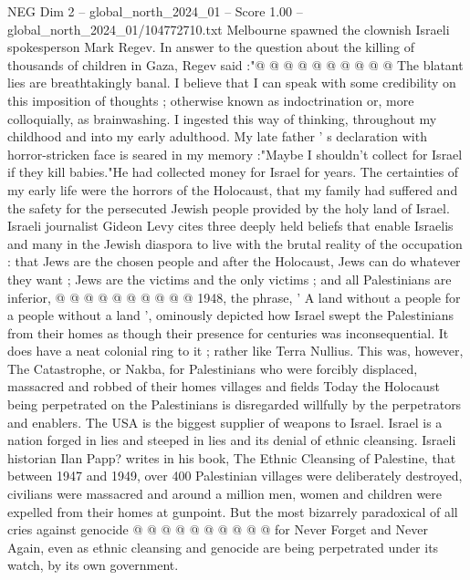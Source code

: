\begin{textsample}{NEG Dim 2 – global\_north\_2024\_01 – Score 1.00 – global\_north\_2024\_01/104772710.txt}
Melbourne spawned the clownish Israeli spokesperson Mark Regev.
In answer to the question about the killing of thousands of children in Gaza, Regev said :"@ @ @ @ @ @ @ @ @ @ The blatant lies are breathtakingly banal.
I believe that I can speak with some credibility on this imposition of thoughts ; otherwise known as indoctrination or, more colloquially, as brainwashing.
I ingested this way of thinking, throughout my childhood and into my early adulthood.
My late father ' s declaration with horror-stricken face is seared in my memory :"Maybe I shouldn't collect for Israel if they kill babies."He had collected money for Israel for years.
The certainties of my early life were the horrors of the Holocaust, that my family had suffered and the safety for the persecuted Jewish people provided by the holy land of Israel.
Israeli journalist Gideon Levy cites three deeply held beliefs that enable Israelis and many in the Jewish diaspora to live with the brutal reality of the occupation : that Jews are the chosen people and after the Holocaust, Jews can do whatever they want ; Jews are the victims and the only victims ; and all Palestinians are inferior, @ @ @ @ @ @ @ @ @ @ 1948, the phrase, ' A land without a people for a people without a land ', ominously depicted how Israel swept the Palestinians from their homes as though their presence for centuries was inconsequential.
It does have a neat colonial ring to it ; rather like Terra Nullius.
This was, however, The Catastrophe, or Nakba, for Palestinians who were forcibly displaced, massacred and robbed of their homes villages and fields Today the Holocaust being perpetrated on the Palestinians is disregarded willfully by the perpetrators and enablers.
The USA is the biggest supplier of weapons to Israel.
Israel is a nation forged in lies and steeped in lies and its denial of ethnic cleansing.
Israeli historian Ilan Papp? writes in his book, The Ethnic Cleansing of Palestine, that between 1947 and 1949, over 400 Palestinian villages were deliberately destroyed, civilians were massacred and around a million men, women and children were expelled from their homes at gunpoint.
But the most bizarrely paradoxical of all cries against genocide @ @ @ @ @ @ @ @ @ @ for Never Forget and Never Again, even as ethnic cleansing and genocide are being perpetrated under its watch, by its own government.

\end{textsample}
